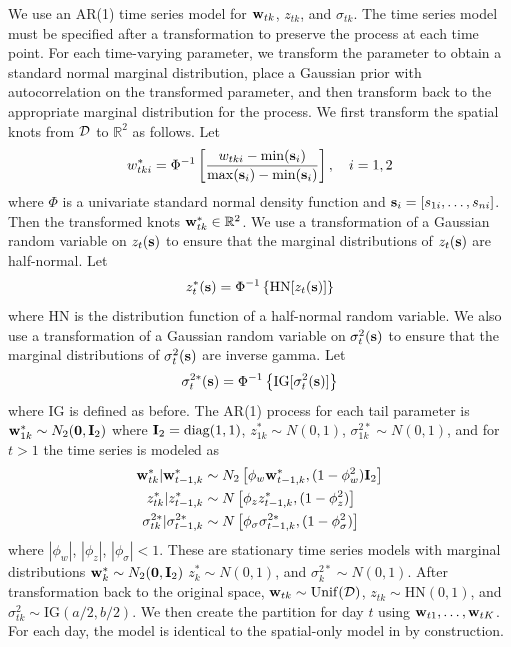 We use an AR(1) time series model for $\mathbf{w}_{tk}$, $z_{tk}$, and $\sigma_{tk}$.
The time series model must be specified after a transformation to preserve the \skewt process at each time point.
For each time-varying parameter, we transform the parameter to obtain a standard normal marginal distribution, place a Gaussian prior with autocorrelation on the transformed parameter, and then transform back to the appropriate marginal distribution for the \skewt process.
We first transform the spatial knots from ${\cal D}$ to $\mathbb{R}^2$ as follows.
Let
\begin{align} \label{steq:wstar}
  w^*_{tki} = \Phi^{-1}\left[ \frac{ w_{tki} - \min(\mathbf{s}_i)}{ \max(\mathbf{s}_i) - \min(\mathbf{s}_i) } \right], \quad i = 1, 2
\end{align}
where $\Phi$ is a univariate standard normal density function and $\mathbf{s}_i = [s_{1i}, \ldots, s_{ni}]$.
Then the transformed knots $\mathbf{w}^*_{tk} \in \mathbb{R}^2$.
We use a transformation of a Gaussian random variable on $z_{t}(\mathbf{s})$ to ensure that the marginal distributions of $z_t(\mathbf{s})$ are half-normal.
Let
\begin{align} \label{steq:zstar}
  z^*_t(\mathbf{s}) = \Phi^{-1}\left\{ \text{HN}[z_t(\mathbf{s})] \right\}
\end{align}
where HN is the distribution function of a half-normal random variable.
We also use a transformation of a Gaussian random variable on $\sigma^2_t(\mathbf{s})$ to ensure that the marginal distributions of $\sigma^2_t(\mathbf{s})$ are inverse gamma.
Let
\begin{align} \label{steq:sigmastar}
  \sigma^{2*}_t(\mathbf{s}) =\Phi^{-1}\left\{ \text{IG}[\sigma^2_t(\mathbf{s})] \right\}
\end{align}
where IG is defined as before.
The AR(1) process for each tail parameter is $\mathbf{w}^*_{1k} \sim N_2(\mathbf{0}, \mathbf{I}_2)$ where $\mathbf{I}_2 = \text{diag}(1, 1)$, $z^*_{1k} \sim N(0, 1)$, $\sigma^{2*}_{1k} \sim N(0, 1)$, and for $t > 1$ the time series is modeled as
\begin{align}
  \mathbf{w}^*_{tk} | \mathbf{w}^*_{t-1, k} &\sim N_2\left[\phi_w \mathbf{w}^*_{t-1, k}, (1 - \phi_w^2) \mathbf{I}_2 \right] \label{steq:ts-wstar}\\
  z^*_{tk} | z^*_{t-1, k} &\sim N \left[\phi_z z^*_{t-1, k}, (1 - \phi_z^2)\right] \label{steq:ts-zstar} \\
  \sigma^{2*}_{tk} | \sigma^{2*}_{t-1, k} &\sim N \left[\phi_\sigma \sigma^{2*}_{t-1, k}, (1 - \phi_\sigma^2) \right] \label{steq:ts-sigmastar}
\end{align}
where $|\phi_w|$, $|\phi_z|$, $|\phi_\sigma| < 1$.
These are stationary time series models with marginal distributions \hbox{$\mathbf{w}^*_{k} \sim N_2(\mathbf{0}, \mathbf{I}_2)$} \hbox{$z^*_{k} \sim N(0, 1)$}, and \hbox{$\sigma^{2*}_{k} \sim N(0, 1)$}.
After transformation back to the original space, $\mathbf{w}_{tk} \sim \mathrm{Unif}({\cal D})$, $z_{tk} \sim \mathrm{HN}(0, 1)$, and $\sigma^2_{tk} \sim \mathrm{IG}(a / 2, b / 2)$.
We then create the partition for day $t$ using $\mathbf{w}_{t1}, \ldots, \mathbf{w}_{tK}$.
For each day, the model is identical to the spatial-only model in  by construction.

